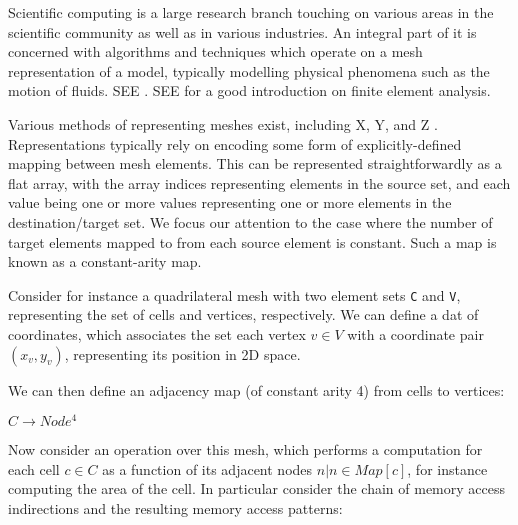 Scientific computing is a large research branch touching on various areas in the scientific community as well as in various industries. An integral part of it is concerned with algorithms and techniques which operate on a mesh representation of a model, typically modelling physical phenomena such as the motion of fluids. SEE
. SEE
for a good introduction on finite element analysis.


Various methods of representing meshes exist, including X, Y, and Z
. Representations typically rely on encoding some form of explicitly-defined mapping between mesh elements. This can be represented straightforwardly as a flat array, with the array indices representing elements in the source set, and each value being one or more values representing one or more elements in the destination/target set. We focus our attention to the case where the number of target elements mapped to from each source element is constant. Such a map is known as a constant-arity map.

Consider for instance a quadrilateral mesh with two element sets \texttt{C} and \texttt{V}, representing the set of cells and vertices, respectively.
We can define a dat of coordinates, which associates the set each vertex $v \in V$ with a coordinate pair $(x_v, y_v)$, representing its position in 2D space.

We can then define an adjacency map (of constant arity 4) from cells to vertices:

\texttt{$C \rightarrow Node^4$}

Now consider an operation over this mesh, which performs a computation for each cell $c \in C$ as a function of its adjacent nodes ${n | n \in Map[c]}$, for instance computing the area of the cell. In particular consider the chain of memory access indirections and the resulting memory access patterns:

%

